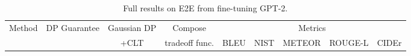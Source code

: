 





 








\setlength{\tabcolsep}{2.5pt}
\renewcommand{\arraystretch}{0.75}
\begin{table}[h]
\footnotesize
\caption{
Full results on E2E from fine-tuning GPT-2.
}
\centering
\begin{tabular}{l c c c ccccc}
\toprule
\multirow{2}[0]{*}{Method} & \multirow{2}[0]{*}{DP Guarantee} & Gaussian DP & Compose & \multicolumn{5}{c}{Metrics}  \\
 & & +CLT & tradeoff func. & 
\scriptsize{BLEU} &
\scriptsize{NIST} &
\scriptsize{METEOR} &
\scriptsize{ROUGE-L} &
\scriptsize{CIDEr} \\


\end{tabular}
\end{table}
